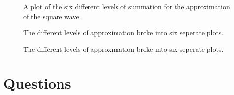 \documentclass[12pt]{report}
\begin{document}
    \begin{figure}
    \begin{center}
    \end{center}
    \caption{A plot of the six different levels of summation for the approximation of the square wave.}
\end{figure}
    
    \begin{figure}
    \begin{center}
    \end{center}
    \caption{The different levels of approximation broke into six seperate plots.}
\end{figure}
    
    \begin{figure}
    \begin{center}
    \end{center}
    \caption{The different levels of approximation broke into six seperate plots.}
\end{figure}
    
\hypertarget{questions}{%
\chapter{Questions}\label{questions}}
\end{document}
